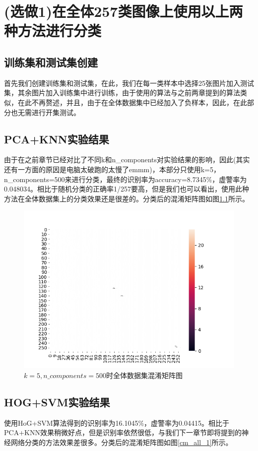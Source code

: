 \documentclass[cn]{elegantbook}
\begin{document}
\chapter{(选做1)在全体257类图像上使用以上两种方法进行分类}
\section{训练集和测试集创建}
首先我们创建训练集和测试集，在此，我们在每一类样本中选择25张图片加入测试集，其余图片加入训练集中进行训练，由于使用的算法与之前两章提到的算法类似，在此不再赘述，并且，由于在全体数据集中已经加入了负样本，因此，在此部分也无需进行开集测试。

\section{PCA+KNN实验结果}
由于在之前章节已经对比了不同k和n\_components对实验结果的影响，因此(其实还有一方面的原因是电脑太破跑的太慢了emmm)，本部分只使用k=5，n\_components=500来进行分类，最终的识别率为accuracy=8.7345\%，虚警率为0.048034。相比于随机分类的正确率1/257要高，但是我们也可以看出，使用此种方法在全体数据集上的分类效果还是很差的。分类后的混淆矩阵图如图\ref{cm_all}所示。

\begin{figure}[!h]
	\centering
	\includegraphics[width=0.9\linewidth]{../results/cm_pca_knn}
	\caption{\label{cm_all}$k=5, n\_components=500$时全体数据集混淆矩阵图}
\end{figure}
\section{HOG+SVM实验结果}
使用HoG+SVM算法得到的识别率为16.1045\%，虚警率为0.04415。相比于PCA+KNN效果稍微好点，但是识别率依然很低，与我们下一章节即将提到的神经网络分类的方法效果差很多。分类后的混淆矩阵图如图\ref{cm_all_1}所示。
\end{document}
